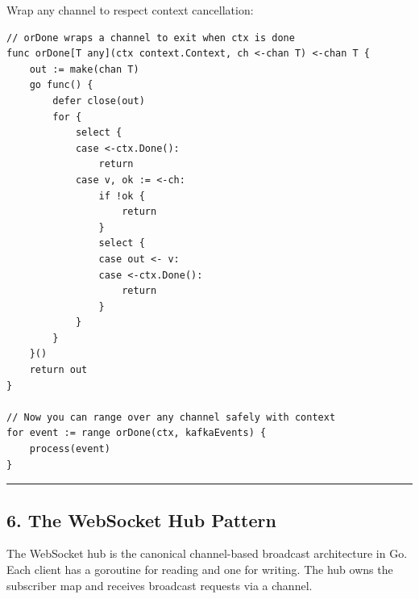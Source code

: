 \documentclass[11pt,a4paper,oneside]{book}
\begin{document}
Wrap any channel to respect context cancellation:

\begin{verbatim}
// orDone wraps a channel to exit when ctx is done
func orDone[T any](ctx context.Context, ch <-chan T) <-chan T {
    out := make(chan T)
    go func() {
        defer close(out)
        for {
            select {
            case <-ctx.Done():
                return
            case v, ok := <-ch:
                if !ok {
                    return
                }
                select {
                case out <- v:
                case <-ctx.Done():
                    return
                }
            }
        }
    }()
    return out
}

// Now you can range over any channel safely with context
for event := range orDone(ctx, kafkaEvents) {
    process(event)
}
\end{verbatim}

\begin{center}\rule{0.5\linewidth}{0.5pt}\end{center}

\subsection{6. The WebSocket Hub
Pattern}

The WebSocket hub is the canonical channel-based broadcast architecture
in Go. Each client has a goroutine for reading and one for writing. The
hub owns the subscriber map and receives broadcast requests via a
channel.
\end{document}
